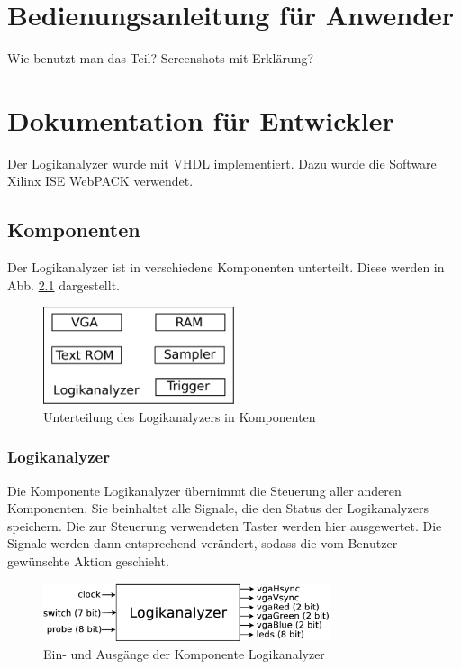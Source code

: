 \documentclass[IN,ngerman,utf8,12pt]{tumbook}
\begin{document}
\chapter{Bedienungsanleitung für Anwender}
Wie benutzt man das Teil? Screenshots mit Erklärung?

\chapter{Dokumentation für Entwickler}

Der Logikanalyzer wurde mit VHDL implementiert.
Dazu wurde die Software Xilinx ISE WebPACK verwendet.

\section{Komponenten}

Der Logikanalyzer ist in verschiedene Komponenten unterteilt.
Diese werden in Abb. \ref{abb:komp} dargestellt.

\begin{figure}
    \centerline{
        \includegraphics[width=0.5\textwidth]{img/komponenten}
    }
    \label{abb:komp}
    \caption{Unterteilung des Logikanalyzers in Komponenten}
\end{figure}

\subsection{Logikanalyzer}
Die Komponente Logikanalyzer übernimmt die Steuerung aller anderen Komponenten.
Sie beinhaltet alle Signale, die den Status der Logikanalyzers speichern.
Die zur Steuerung verwendeten Taster werden hier ausgewertet.
Die Signale werden dann entsprechend verändert, sodass die vom Benutzer gewünschte Aktion geschieht.

\begin{figure}[H]
    \centerline{
        \includegraphics[width=0.75\textwidth]{img/logikanalyzer}
    }
    \label{abb:logikanalyzer}
    \caption{Ein- und Ausgänge der Komponente Logikanalyzer}
\end{figure}
\end{document}
